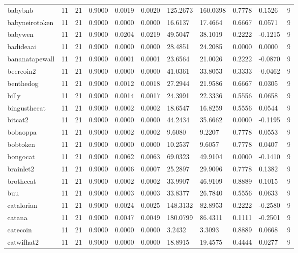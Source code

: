 \begin{table}[htbp]
\begin{tabular}{lllllllllll}
babybnb & 11 & 21 & 0.9000 & 0.0019 & 0.0020 & 125.2673 & 160.0398 & 0.7778 & 0.1526 & 9 \\
babyneirotoken & 11 & 21 & 0.9000 & 0.0000 & 0.0000 & 16.6137 & 17.4664 & 0.6667 & 0.0571 & 9 \\
babywen & 11 & 21 & 0.9000 & 0.0204 & 0.0219 & 49.5047 & 38.1019 & 0.2222 & -0.1215 & 9 \\
badideaai & 11 & 21 & 0.9000 & 0.0000 & 0.0000 & 28.4851 & 24.2085 & 0.0000 & 0.0000 & 9 \\
bananatapewall & 11 & 21 & 0.9000 & 0.0001 & 0.0001 & 23.6564 & 21.0026 & 0.2222 & -0.0870 & 9 \\
beercoin2 & 11 & 21 & 0.9000 & 0.0000 & 0.0000 & 41.0361 & 33.8053 & 0.3333 & -0.0462 & 9 \\
benthedog & 11 & 21 & 0.9000 & 0.0012 & 0.0018 & 27.2944 & 21.9586 & 0.6667 & 0.0305 & 9 \\
billy & 11 & 21 & 0.9000 & 0.0014 & 0.0017 & 24.3991 & 22.3336 & 0.5556 & 0.0658 & 9 \\
bingusthecat & 11 & 21 & 0.9000 & 0.0002 & 0.0002 & 18.6547 & 16.8259 & 0.5556 & 0.0544 & 9 \\
bitcat2 & 11 & 21 & 0.9000 & 0.0000 & 0.0000 & 44.2434 & 35.6662 & 0.0000 & -0.1195 & 9 \\
bobaoppa & 11 & 21 & 0.9000 & 0.0002 & 0.0002 & 9.6080 & 9.2207 & 0.7778 & 0.0553 & 9 \\
bobtoken & 11 & 21 & 0.9000 & 0.0000 & 0.0000 & 10.2537 & 9.6057 & 0.7778 & 0.0407 & 9 \\
bongocat & 11 & 21 & 0.9000 & 0.0062 & 0.0063 & 69.0323 & 49.9104 & 0.0000 & -0.1410 & 9 \\
brainlet2 & 11 & 21 & 0.9000 & 0.0006 & 0.0007 & 25.2897 & 29.9096 & 0.7778 & 0.1382 & 9 \\
brothecat & 11 & 21 & 0.9000 & 0.0002 & 0.0002 & 33.9907 & 46.9109 & 0.8889 & 0.1015 & 9 \\
buu & 11 & 21 & 0.9000 & 0.0003 & 0.0003 & 33.8377 & 26.7840 & 0.5556 & 0.0633 & 9 \\
catalorian & 11 & 21 & 0.9000 & 0.0024 & 0.0025 & 148.3132 & 82.8953 & 0.2222 & -0.2580 & 9 \\
catana & 11 & 21 & 0.9000 & 0.0047 & 0.0049 & 180.0799 & 86.4311 & 0.1111 & -0.2501 & 9 \\
catecoin & 11 & 21 & 0.9000 & 0.0000 & 0.0000 & 3.2432 & 3.3093 & 0.8889 & 0.0668 & 9 \\
catwifhat2 & 11 & 21 & 0.9000 & 0.0000 & 0.0000 & 18.8915 & 19.4575 & 0.4444 & 0.0277 & 9 \\

\end{tabular}
\end{table}
